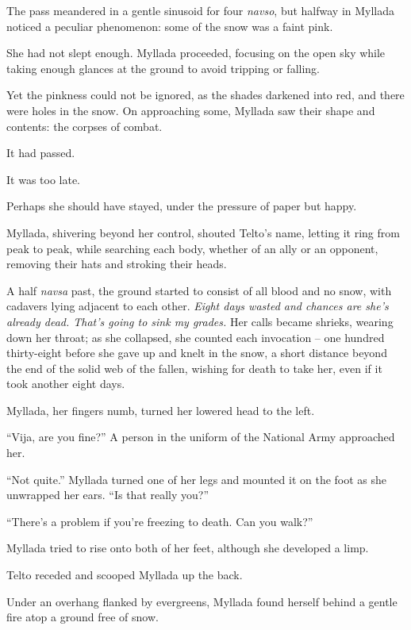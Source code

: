 The pass meandered in a gentle sinusoid for four \emph{navso}, but halfway in Myllada noticed a peculiar phenomenon: some of the snow was a faint pink.

She had not slept enough. Myllada proceeded, focusing on the open sky while taking enough glances at the ground to avoid tripping or falling.

Yet the pinkness could not be ignored, as the shades darkened into red, and there were holes in the snow. On approaching some, Myllada saw their shape and contents: the corpses of combat.

It had passed.

It was too late.

Perhaps she should have stayed, under the pressure of paper but happy.

Myllada, shivering beyond her control, shouted Telto's name, letting it ring from peak to peak, while searching each body, whether of an ally or an opponent, removing their hats and stroking their heads.

A half \emph{navsa} past, the ground started to consist of all blood and no snow, with cadavers lying adjacent to each other. \emph{Eight days wasted and chances are she's already dead. That's going to sink my grades.} Her calls became shrieks, wearing down her throat; as she collapsed, she counted each invocation -- one hundred thirty-eight before she gave up and knelt in the snow, a short distance beyond the end of the solid web of the fallen, wishing for death to take her, even if it took another eight days.

\centeredstars

Myllada, her fingers numb, turned her lowered head to the left.

``Vija, are you fine?'' A person in the uniform of the National Army approached her.

``Not quite.'' Myllada turned one of her legs and mounted it on the foot as she unwrapped her ears. ``Is that really you?''

``There's a problem if you're freezing to death. Can you walk?''

Myllada tried to rise onto both of her feet, although she developed a limp.

Telto receded and scooped Myllada up the back.

\centeredstars

Under an overhang flanked by evergreens, Myllada found herself behind a gentle fire atop a ground free of snow.

